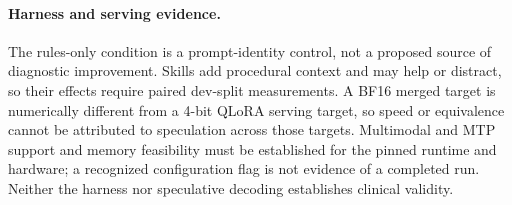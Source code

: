 \paragraph{Harness and serving evidence.}
The rules-only condition is a prompt-identity control, not a proposed source of diagnostic
improvement. Skills add procedural context and may help or distract, so their effects require
paired dev-split measurements. A BF16 merged target is numerically different from a 4-bit
QLoRA serving target, so speed or equivalence cannot be attributed to speculation across those
targets. Multimodal and MTP support and memory feasibility must be established for the pinned
runtime and hardware; a recognized configuration flag is not evidence of a completed run.
Neither the harness nor speculative decoding establishes clinical validity.
